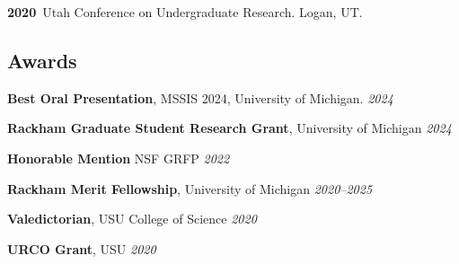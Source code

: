 \documentclass[11pt]{article}
\newenvironment {reflist}
                {
                 \begin{list}{}
                 {\setlength{\labelwidth}{0mm}
                  \setlength{\leftmargin}{8mm}
                  \setlength{\itemindent}{-3mm}
                  \setlength{\labelsep}{0mm}
                  \setlength{\parsep}{0.1 ex}
                  \setlength{\itemsep}{0.1cm}
      \setlength{\topsep}{0.15cm}}} %
   {\end{list}}
\begin{document}
\begin{reflist}
    \item \textbf{2020}\, Utah Conference on Undergraduate Research. Logan, UT.


\end{reflist}

\subsection*{Awards}

\noindent\hspace{5mm}\textbf{Best Oral Presentation}, MSSIS 2024, University of Michigan. \hfill {\textit{2024}}

\hspace{5mm}{\it Award amount: $\$200$}


\vspace{2mm}
\noindent\hspace{5mm}\textbf{Rackham Graduate Student Research Grant}, University of Michigan \hfill {\textit{2024}}

\hspace{5mm}{\it Award amount: $\$2500$}

\vspace{2mm}
\noindent\hspace{5mm}\textbf{Honorable Mention} NSF GRFP \hfill {\textit{2022}}

\vspace{2mm}
\noindent\hspace{5mm}\textbf{Rackham Merit Fellowship}, University of Michigan \hfill {\textit{2020--2025}}

\vspace{2mm}
\noindent\hspace{5mm}\textbf{Valedictorian}, USU College of Science \hfill {\textit{2020}}

\vspace{2mm}
\noindent\hspace{5mm}\textbf{URCO Grant}, USU \hfill  {\textit{2020}}
\end{document}
